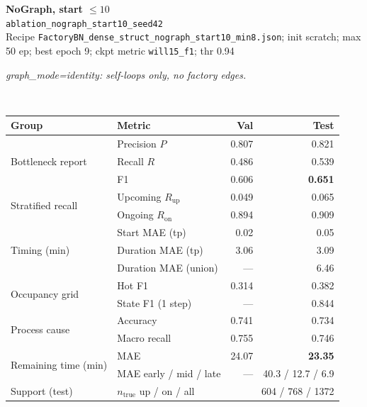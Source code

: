 \documentclass[9pt,a4paper,twocolumn]{extarticle}
\begin{document}
\noindent\begin{minipage}{\columnwidth}
\begin{center}
{\small\bfseries NoGraph, start $\le 10$}\\
{\scriptsize\texttt{ablation\_nograph\_start10\_seed42}}\\
{\scriptsize Recipe \texttt{FactoryBN\_dense\_struct\_nograph\_start10\_min8.json}; init scratch; max 50 ep; best epoch 9; ckpt metric \texttt{will15\_f1}; thr 0.94}\\[1pt]
\parbox{0.96\columnwidth}{\scriptsize\itshape graph\_mode=identity: self-loops only, no factory edges.}\\[2pt]
\scriptsize\setlength{\tabcolsep}{3pt}
\begin{tabular}{llrr}
\toprule
Group & Metric & Val & Test \\
\midrule
\multirow{3}{*}{Bottleneck report}
  & Precision $P$ & 0.807 & 0.821 \\
  & Recall $R$ & 0.486 & 0.539 \\
  & F1 & 0.606 & \textbf{0.651} \\
\midrule
\multirow{2}{*}{Stratified recall}
  & Upcoming $R_{\mathrm{up}}$ & 0.049 & 0.065 \\
  & Ongoing $R_{\mathrm{on}}$ & 0.894 & 0.909 \\
\midrule
\multirow{3}{*}{Timing (min)}
  & Start MAE (tp) & 0.02 & 0.05 \\
  & Duration MAE (tp) & 3.06 & 3.09 \\
  & Duration MAE (union) & --- & 6.46 \\
\midrule
\multirow{2}{*}{Occupancy grid}
  & Hot F1 & 0.314 & 0.382 \\
  & State F1 (1 step) & --- & 0.844 \\
\midrule
\multirow{2}{*}{Process cause}
  & Accuracy & 0.741 & 0.734 \\
  & Macro recall & 0.755 & 0.746 \\
\midrule
\multirow{2}{*}{Remaining time (min)}
  & MAE & 24.07 & \textbf{23.35} \\
  & MAE early / mid / late & --- & 40.3 / 12.7 / 6.9 \\
\midrule
Support (test)
  & $n_{\mathrm{true}}$ up / on / all & \multicolumn{2}{r}{604 / 768 / 1372} \\
\bottomrule
\end{tabular}
\end{center}
\end{minipage}\par\vspace{6pt}
\end{document}
